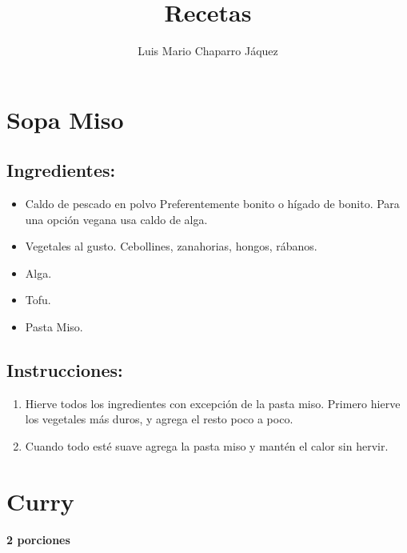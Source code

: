 \documentclass{book}
\title{Recetas}
\author{Luis Mario Chaparro Jáquez}
\begin{document}
\maketitle
\tableofcontents

\newpage
\section{Sopa Miso}
\subsection*{Ingredientes:}
\begin{itemize}
	\item Caldo de pescado en polvo 
		\subitem Preferentemente bonito o hígado de bonito.
		\subitem Para una opción vegana usa caldo de alga.
	\item Vegetales al gusto.
		\subitem Cebollines, zanahorias, hongos, rábanos.
	\item Alga.
	\item Tofu.
	\item Pasta Miso.
\end{itemize}
\subsection*{Instrucciones:}
\begin{enumerate}
	\item Hierve todos los ingredientes con excepción de la pasta miso.
		Primero hierve los vegetales más duros, y agrega el resto poco a poco.
	\item Cuando todo esté suave agrega la pasta miso y mantén el calor sin hervir.
\end{enumerate}

\newpage
\section{Curry}
\textbf{2 porciones}
\end{document}
